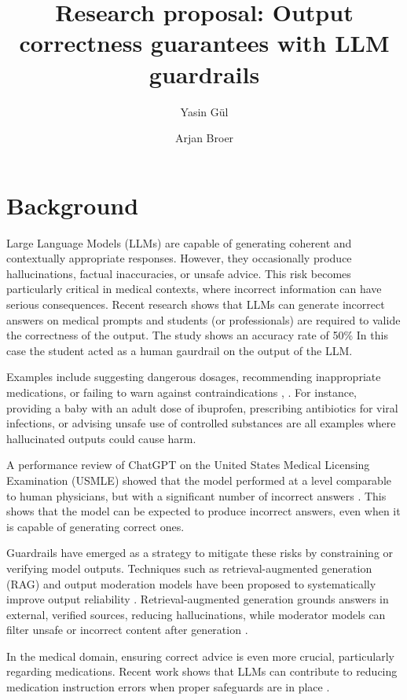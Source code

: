 \documentclass[a4paper,doc,natbib]{apa6}
\title{Research proposal: Output correctness guarantees with LLM guardrails}
\author{Yasin G\"{u}l \and Arjan Broer}
\affiliation{Open University of the Netherlands}
\begin{document}
    \maketitle

    \section{Background}

    Large Language Models (LLMs) are capable of generating coherent and contextually appropriate responses.
    However, they occasionally produce hallucinations, factual inaccuracies, or unsafe advice.
    This risk becomes particularly critical in medical contexts, where incorrect information can have serious consequences.
    Recent research \citep{waldock2025curriculum} shows that LLMs can generate incorrect answers on medical prompts and students (or professionals) are required to valide the correctness of the output.
    The study shows an accuracy rate of 50\% In this case the student acted as a human gaurdrail on the output of the LLM.

    Examples include suggesting dangerous dosages, recommending inappropriate medications, or failing to warn against contraindications \citep{luo2024clinical}, \citep{schieszer2023large}.
    For instance, providing a baby with an adult dose of ibuprofen, prescribing antibiotics for viral infections, or advising unsafe use of controlled substances are all examples where hallucinated outputs could cause harm.

    A performance review of ChatGPT on the United States Medical Licensing Examination (USMLE) showed that the model performed at a level comparable to human physicians, but with a significant number of incorrect answers \citep{kung2023performance}.
    This shows that the model can be expected to produce incorrect answers, even when it is capable of generating correct ones.

    Guardrails have emerged as a strategy to mitigate these risks by constraining or verifying model outputs.
    Techniques such as retrieval-augmented generation (RAG) and output moderation models have been proposed to systematically improve output reliability \citep{dong2024guardrails}.
    Retrieval-augmented generation grounds answers in external, verified sources, reducing hallucinations, while moderator models can filter unsafe or incorrect content after generation \citep{inan2023llamaguard}.

    In the medical domain, ensuring correct advice is even more crucial, particularly regarding medications.
    Recent work shows that LLMs can contribute to reducing medication instruction errors when proper safeguards are in place \citep{pais2024medication}.
\end{document}
